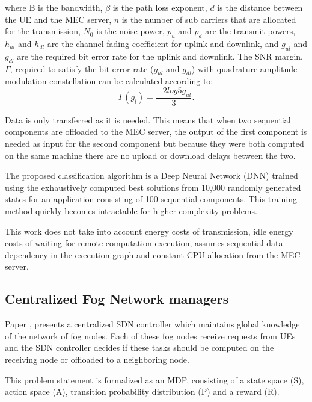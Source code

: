 where B is the bandwidth, $\beta$ is the path loss exponent, $d$ is the distance between the \acrshort{UE} and the \acrshort{MEC} server, $n$ is the number of sub carriers that are allocated for the transmission, $N_0$ is the noise power, $p_u$ and $p_d$ are the transmit powers, $h_{ul}$ and $h_{dl}$ are the channel fading coefficient for uplink and downlink, and $g_{ul}$ and $g_{dl}$ are the required bit error rate for the uplink and downlink. The SNR margin, $\Gamma$, required to satisfy the bit error rate ($g_{ul}$ and $g_{dl}$) with quadrature amplitude modulation constellation can be calculated according to:
\begin{equation} \label{SNR}
    \Gamma(g_{l}) = \frac{-2log5g_{ul}}{3} .
\end{equation}

Data is only transferred as it is needed. This means that when two sequential components are offloaded to the \acrshort{MEC} server, the output of the first component is needed as input for the second component but because they were both computed on the same machine there are no upload or download delays between the two.

The proposed classification algorithm is a Deep Neural Network (DNN) trained using the exhaustively computed best solutions from 10,000 randomly generated states for an application consisting of 100 sequential components. This training method quickly becomes intractable for higher complexity problems.

This work does not take into account energy costs of transmission, idle energy costs of waiting for remote computation execution, assumes sequential data dependency in the execution graph and constant \acrshort{CPU} allocation from the \acrshort{MEC} server. 

\subsection{Centralized Fog Network managers}
\noindent Paper \cite{centralfog}, presents a centralized \acrfull{SDN} controller which maintains global knowledge of the network of fog nodes. Each of these fog nodes receive requests from \acrshort{UE}s and the \acrshort{SDN} controller decides if these tasks should be computed on the receiving node or offloaded to a neighboring node.

This problem statement is formalized as an \acrshort{MDP}, consisting of a state space (S), action space (A), transition probability distribution (P) and a reward (R).

